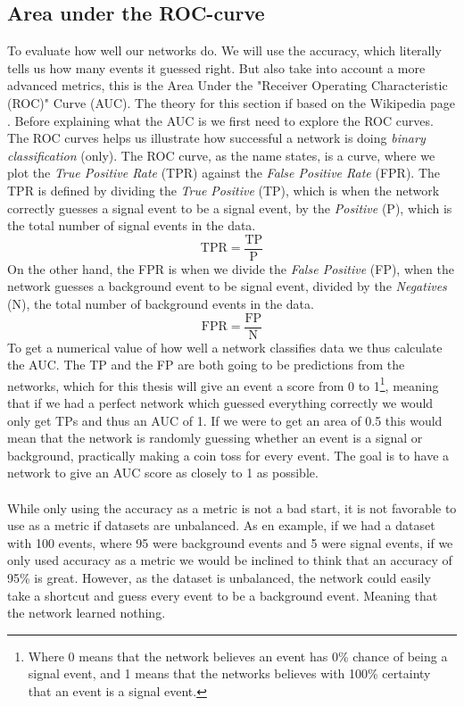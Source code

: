 \documentclass[12pt, a4paper]{book}
\begin{document}
\subsection{Area under the ROC-curve}
To evaluate how well our networks do. We will use the accuracy, which literally tells us how many events it guessed right. But also take into account a more advanced metrics, this is the Area Under the "Receiver Operating Characteristic (ROC)" Curve (AUC). The theory for this section if based on the Wikipedia page \cite{roc_wikipedia}.
Before explaining what the AUC is we first need to explore the ROC curves. The ROC curves helps us illustrate how successful a network is doing \textit{binary classification} (only). The ROC curve, as the name states, is a curve, where we plot the \textit{True Positive Rate} (TPR) against 
the \textit{False Positive Rate} (FPR). The TPR is defined by dividing the \textit{True Positive} (TP), which is when the network correctly guesses a signal event to be a signal event, by the \textit{Positive} (P), which is the total number of signal events in the data. 
$$
\text{TPR} =\frac{\text{TP}}{\text{P}}
$$
On the other hand, the FPR is when we divide the \textit{False Positive} (FP), when the network guesses a background event to be signal event, divided by the \textit{Negatives} (N), the total number of background events in the data.
$$
\text{FPR} =\frac{\text{FP}}{\text{N}}
$$
To get a numerical value of how well a network classifies data we thus calculate the AUC. The TP and the FP are both going to be predictions from the networks, which for this thesis will give an event a score from 0 to 1\footnote{Where 0 means that the network believes an event has 0\% chance of being a signal event, and 1 means that the networks believes with 100\% certainty that an event is a signal event.}, 
meaning that if we had a perfect network which guessed everything correctly we would only get TPs and thus an AUC of 1. If we were to get an area of 0.5 this would mean that the network is randomly guessing whether an event is a signal or background, practically making a coin toss for every event. 
The goal is to have a network to give an AUC score as closely to 1 as possible. \\
\\While only using the accuracy as a metric is not a bad start, it is not favorable to use as a metric if datasets are unbalanced. As en example, if we had a dataset with 100 events, where 95 were background events and 5 were signal events, if we only used accuracy as a metric we would 
be inclined to think that an accuracy of 95\% is great. However, as the dataset is unbalanced, the network could easily take a shortcut and guess every event to be a background event. Meaning that the network learned nothing.
\end{document}
